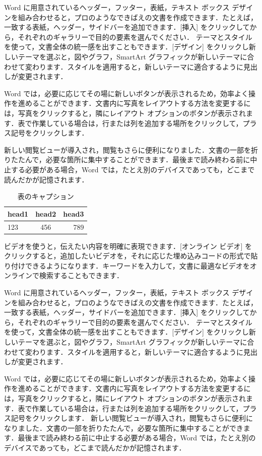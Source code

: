 Word に用意されているヘッダー，フッター，表紙，テキスト ボックス デザインを組み合わせると，プロのようなできばえの文書を作成できます．たとえば，一致する表紙，ヘッダー，サイドバーを追加できます．[挿入] をクリックしてから，それぞれのギャラリーで目的の要素を選んでください．
テーマとスタイルを使って，文書全体の統一感を出すこともできます．[デザイン] をクリックし新しいテーマを選ぶと，図やグラフ，SmartArt グラフィックが新しいテーマに合わせて変わります．スタイルを適用すると，新しいテーマに適合するように見出しが変更されます．

Word では，必要に応じてその場に新しいボタンが表示されるため，効率よく操作を進めることができます．文書内に写真をレイアウトする方法を変更するには，写真をクリックすると，隣にレイアウト オプションのボタンが表示されます．表で作業している場合は，行または列を追加する場所をクリックして，プラス記号をクリックします．

新しい閲覧ビューが導入され，閲覧もさらに便利になりました．文書の一部を折りたたんで，必要な箇所に集中することができます．最後まで読み終わる前に中止する必要がある場合，Word では，たとえ別のデバイスであっても，どこまで読んだかが記憶されます．

\begin{table}[htb]
    \caption{表のキャプション}
    \centering
    \begin{tabular}{lcr}
        \hline
        head1 & head2 & head3 \\ 
        \hline\hline
        123 & 456 & 789\\
        \hline
    \end{tabular}
    \label{tab:my_label}
\end{table}

ビデオを使うと，伝えたい内容を明確に表現できます．[オンライン ビデオ] をクリックすると，追加したいビデオを，それに応じた埋め込みコードの形式で貼り付けできるようになります．キーワードを入力して，文書に最適なビデオをオンラインで検索することもできます．

Word に用意されているヘッダー，フッター，表紙，テキスト ボックス デザインを組み合わせると，プロのようなできばえの文書を作成できます．たとえば，一致する表紙，ヘッダー，サイドバーを追加できます．[挿入] をクリックしてから，それぞれのギャラリーで目的の要素を選んでください．
テーマとスタイルを使って，文書全体の統一感を出すこともできます．[デザイン] をクリックし新しいテーマを選ぶと，図やグラフ，SmartArt グラフィックが新しいテーマに合わせて変わります．スタイルを適用すると，新しいテーマに適合するように見出しが変更されます．

Word では，必要に応じてその場に新しいボタンが表示されるため，効率よく操作を進めることができます．文書内に写真をレイアウトする方法を変更するには，写真をクリックすると，隣にレイアウト オプションのボタンが表示されます．表で作業している場合は，行または列を追加する場所をクリックして，プラス記号をクリックします．
新しい閲覧ビューが導入され，閲覧もさらに便利になりました．文書の一部を折りたたんで，必要な箇所に集中することができます．最後まで読み終わる前に中止する必要がある場合，Word では，たとえ別のデバイスであっても，どこまで読んだかが記憶されます．

